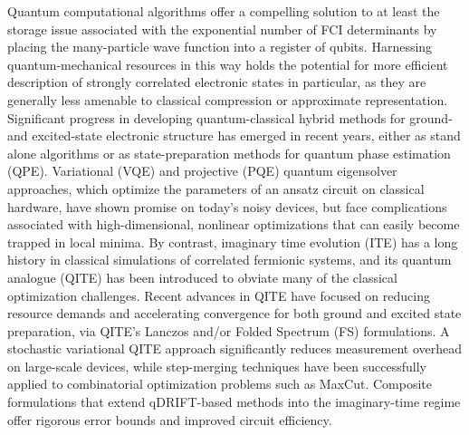 \documentclass[aip,jcp,amsmath,amssymb, reprint]{revtex4-1}
\begin{document}
Quantum computational algorithms offer a compelling solution to at least the storage issue associated with the exponential number of FCI determinants by placing the many-particle wave function into a register of qubits.\cite{Abrams:1997ha,kassal2011simulating} 
Harnessing quantum-mechanical resources in this way holds the potential for more efficient description of strongly correlated electronic states in particular, as they are generally less amenable to classical compression or approximate representation. 
Significant progress in developing quantum-classical hybrid methods for ground- and excited-state electronic structure has emerged in recent years, either as stand alone algorithms or as state-preparation methods for quantum phase estimation (QPE).\cite{Abrams:1999ur}
Variational (VQE)\cite{Peruzzo:2014kca, yung2014transistor, McClean:2016bs, grimsley2019adaptive} and projective (PQE)\cite{stair2021simulating} quantum eigensolver approaches, which optimize the parameters of an ansatz circuit on classical hardware, have shown promise on today's noisy devices,\cite{OMalley:2016dc, colless2018computation, shen2017quantum, hempel2018quantum, nam2020ground} but face complications associated with high-dimensional, nonlinear optimizations that can easily become trapped in local minima. 
By contrast, imaginary time evolution (ITE) has a long history in classical simulations of correlated fermionic systems,\cite{feynman1948space,ceperley1980ground,sugiyama1986auxiliary,zhang1997constrained,foulkes2001quantum} and its quantum analogue (QITE) has been introduced\cite{motta2019determining} to obviate many of the classical optimization challenges. 
Recent advances in QITE have focused on reducing resource demands and accelerating convergence for both ground and excited state preparation, via QITE's Lanczos and/or Folded Spectrum (FS) formulations.
A stochastic variational QITE approach significantly reduces measurement overhead on large-scale devices,\cite{gacon2023stochastic} while step-merging techniques have been successfully applied to combinatorial optimization problems such as MaxCut.\cite{gomes2020efficient,alam2023solving}
Composite formulations that extend qDRIFT-based methods into the imaginary-time regime offer rigorous error bounds and improved circuit efficiency.\cite{pocrnic2024composite, hagan2023composite} 
\end{document}
